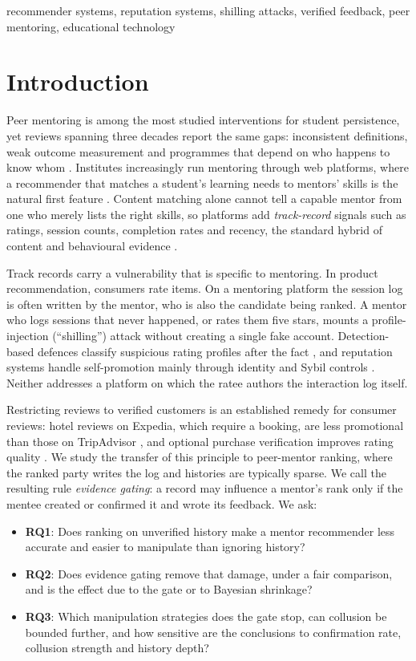 \documentclass[conference]{IEEEtran}
\newcommand{\RQ}[1]{\textbf{RQ#1}}
\begin{document}
\begin{IEEEkeywords}
recommender systems, reputation systems, shilling attacks, verified feedback, peer mentoring, educational technology
\end{IEEEkeywords}

\section{Introduction}
Peer mentoring is among the most studied interventions for student persistence, yet reviews spanning three decades report the same gaps: inconsistent definitions, weak outcome measurement and programmes that depend on who happens to know whom \cite{jacobi1991,gershenfeld2014}. Institutes increasingly run mentoring through web platforms, where a recommender that matches a student's learning needs to mentors' skills is the natural first feature \cite{manouselis2011,pham2023}. Content matching alone cannot tell a capable mentor from one who merely lists the right skills, so platforms add \emph{track-record} signals such as ratings, session counts, completion rates and recency, the standard hybrid of content and behavioural evidence \cite{burke2002}.

Track records carry a vulnerability that is specific to mentoring. In product recommendation, consumers rate items. On a mentoring platform the session log is often written by the mentor, who is also the candidate being ranked. A mentor who logs sessions that never happened, or rates them five stars, mounts a profile-injection (``shilling'') attack \cite{lam2004,mobasher2007} without creating a single fake account. Detection-based defences classify suspicious rating profiles after the fact \cite{gunes2014,si2020}, and reputation systems handle self-promotion mainly through identity and Sybil controls \cite{hoffman2009,cheng2005}. Neither addresses a platform on which the ratee authors the interaction log itself.

Restricting reviews to verified customers is an established remedy for consumer reviews: hotel reviews on Expedia, which require a booking, are less promotional than those on TripAdvisor \cite{mayzlin2014}, and optional purchase verification improves rating quality \cite{kokkodis2022}. We study the transfer of this principle to peer-mentor ranking, where the ranked party writes the log and histories are typically sparse. We call the resulting rule \emph{evidence gating}: a record may influence a mentor's rank only if the mentee created or confirmed it and wrote its feedback. We ask:
\begin{itemize}
\item \RQ{1}: Does ranking on unverified history make a mentor recommender less accurate and easier to manipulate than ignoring history?
\item \RQ{2}: Does evidence gating remove that damage, under a fair comparison, and is the effect due to the gate or to Bayesian shrinkage?
\item \RQ{3}: Which manipulation strategies does the gate stop, can collusion be bounded further, and how sensitive are the conclusions to confirmation rate, collusion strength and history depth?
\end{itemize}
\end{document}
